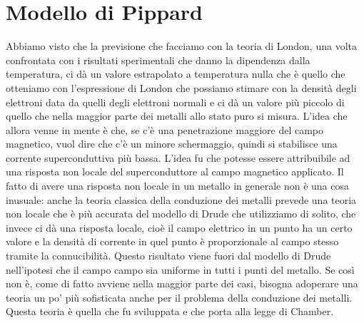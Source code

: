 \section{Modello di Pippard}
Abbiamo visto che la previsione che facciamo con la teoria di London, una volta confrontata con i risultati sperimentali che danno la dipendenza dalla temperatura, ci dà un valore estrapolato a temperatura nulla che è quello che otteniamo con l'espressione di London che possiamo stimare con la densità degli elettroni data da quelli degli elettroni normali e ci dà un valore più piccolo di quello che nella maggior parte dei metalli allo stato puro si misura. L'idea che allora venne in mente è che, se c'è una penetrazione maggiore del campo magnetico, vuol dire che c'è un minore schermaggio, quindi si stabilisce una corrente superconduttiva più bassa. L'idea fu che potesse essere attribuibile ad una risposta non locale del superconduttore al campo magnetico applicato. Il fatto di avere una risposta non locale in un metallo in generale non è una cosa inusuale: anche la teoria classica della conduzione dei metalli prevede una teoria non locale che è più accurata del modello di Drude che utilizziamo di solito, che invece ci dà una risposta locale, cioè il campo elettrico in un punto ha un certo valore e la densità di corrente in quel punto è proporzionale al campo stesso tramite la connucibilità. Questo risultato viene fuori dal modello di Drude nell'ipotesi che il campo campo sia uniforme in tutti i punti del metallo. Se così non è, come di fatto avviene nella maggior parte dei casi, bisogna adoperare una teoria un po' più sofisticata anche per il problema della conduzione dei metalli. Questa teoria è quella che fu sviluppata e che porta alla legge di Chamber.
